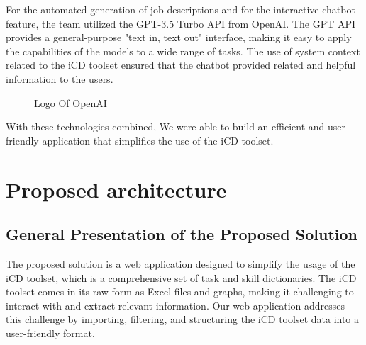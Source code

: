 \newpage
For the automated generation of job descriptions and for the interactive chatbot feature, the team utilized the {\color{purple}GPT-3.5 Turbo API} from OpenAI. The GPT API provides a general-purpose "text in, text out" interface, making it easy to apply the capabilities of the models to a wide range of tasks. The use of system context related to the iCD toolset ensured that the chatbot provided related and helpful information to the users.

\begin{figure}[H]
    \centering
    \caption{  Logo Of OpenAI }
    \label{fig: OpenAI_Logo}
\end{figure}

With these technologies combined, We were able to build an efficient and user-friendly application that simplifies the use of the iCD toolset.


\section{Proposed architecture}
\subsection{General Presentation of the Proposed Solution}

The proposed solution is a web application designed to simplify the usage of the iCD toolset, which is a comprehensive set of task and skill dictionaries. The iCD toolset comes in its raw form as Excel files and graphs, making it challenging to interact with and extract relevant information. Our web application addresses this challenge by importing, filtering, and structuring the iCD toolset data into a user-friendly format.

